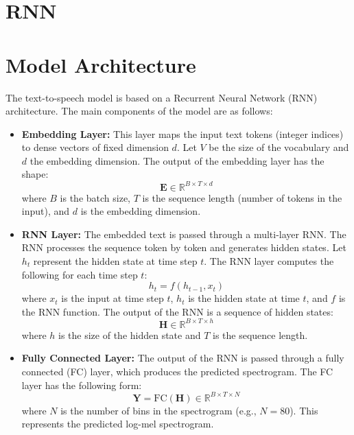 \documentclass[12pt]{article}
\begin{document}
\vspace{1cm}
\vspace{1cm}

\section*{RNN }
\section{Model Architecture}

The text-to-speech model is based on a Recurrent Neural Network (RNN) architecture. The main components of the model are as follows:

\begin{itemize}
    \item \textbf{Embedding Layer:} This layer maps the input text tokens (integer indices) to dense vectors of fixed dimension $d$. Let $V$ be the size of the vocabulary and $d$ the embedding dimension. The output of the embedding layer has the shape:
    \[
    \mathbf{E} \in \mathbb{R}^{B \times T \times d}
    \]
    where $B$ is the batch size, $T$ is the sequence length (number of tokens in the input), and $d$ is the embedding dimension.
    
    \item \textbf{RNN Layer:} The embedded text is passed through a multi-layer RNN. The RNN processes the sequence token by token and generates hidden states. Let $h_t$ represent the hidden state at time step $t$. The RNN layer computes the following for each time step $t$:
    \[
    h_t = f(h_{t-1}, x_t)
    \]
    where $x_t$ is the input at time step $t$, $h_t$ is the hidden state at time $t$, and $f$ is the RNN function. The output of the RNN is a sequence of hidden states:
    \[
    \mathbf{H} \in \mathbb{R}^{B \times T \times h}
    \]
    where $h$ is the size of the hidden state and $T$ is the sequence length.
    
    \item \textbf{Fully Connected Layer:} The output of the RNN is passed through a fully connected (FC) layer, which produces the predicted spectrogram. The FC layer has the following form:
    \[
    \mathbf{Y} = \text{FC}(\mathbf{H}) \in \mathbb{R}^{B \times T \times N}
    \]
    where $N$ is the number of bins in the spectrogram (e.g., $N = 80$). This represents the predicted log-mel spectrogram.

\end{itemize}
\end{document}

